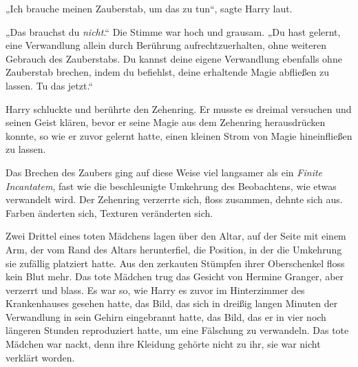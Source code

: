 „Ich brauche meinen Zauberstab, um das zu tun“, sagte Harry laut.

„Das brauchst du \emph{nicht}.“ Die Stimme war hoch und grausam. „Du hast gelernt, eine Verwandlung allein durch Berührung aufrechtzuerhalten, ohne weiteren Gebrauch des Zauberstabs. Du kannst deine eigene Verwandlung ebenfalls ohne Zauberstab brechen, indem du befiehlst, deine erhaltende Magie abfließen zu lassen. Tu das jetzt.“

Harry schluckte und berührte den Zehenring. Er musste es dreimal versuchen und seinen Geist klären, bevor er seine Magie aus dem Zehenring herausdrücken konnte, so wie er zuvor gelernt hatte, einen kleinen Strom von Magie hineinfließen zu lassen.

Das Brechen des Zaubers ging auf diese Weise viel langsamer als ein \emph{Finite Incantatem}, fast wie die beschleunigte Umkehrung des Beobachtens, wie etwas verwandelt wird. Der Zehenring verzerrte sich, floss zusammen, dehnte sich aus. Farben änderten sich, Texturen veränderten sich.

Zwei Drittel eines toten Mädchens lagen über den Altar, auf der Seite mit einem Arm, der vom Rand des Altars herunterfiel, die Position, in der die Umkehrung sie zufällig platziert hatte. Aus den zerkauten Stümpfen ihrer Oberschenkel floss kein Blut mehr. Das tote Mädchen trug das Gesicht von Hermine Granger, aber verzerrt und blass.
Es war so, wie Harry es zuvor im Hinterzimmer des Krankenhauses gesehen hatte, das Bild, das sich in dreißig langen Minuten der Verwandlung in sein Gehirn eingebrannt hatte, das Bild, das er in vier noch längeren Stunden reproduziert hatte, um eine Fälschung zu verwandeln. Das tote Mädchen war nackt, denn ihre Kleidung gehörte nicht zu ihr, sie war nicht verklärt worden.

